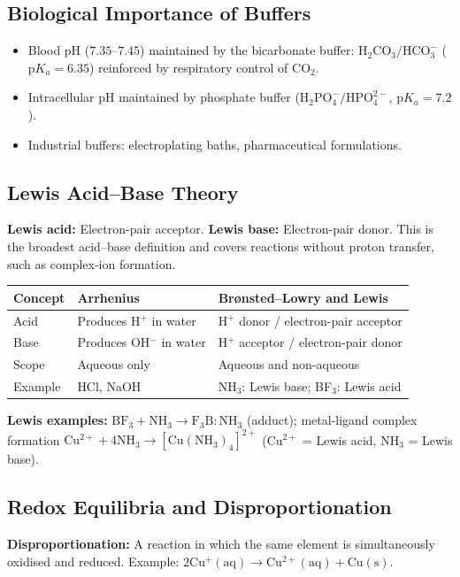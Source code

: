 \documentclass[12pt,a4paper]{article}
\begin{document}
\subsection{Biological Importance of Buffers}
\begin{itemize}[leftmargin=*, itemsep=2pt, topsep=2pt]
  \item Blood pH ($7.35$--$7.45$) maintained by the bicarbonate buffer: $\mathrm{H_2CO_3}/\mathrm{HCO_3^-}$ ($\mathrm{p}K_a = 6.35$) reinforced by respiratory control of $\mathrm{CO_2}$.
  \item Intracellular pH maintained by phosphate buffer ($\mathrm{H_2PO_4^-}/\mathrm{HPO_4^{2-}}$, $\mathrm{p}K_a = 7.2$).
  \item Industrial buffers: electroplating baths, pharmaceutical formulations.
\end{itemize}

\subsection{Lewis Acid--Base Theory}
\begin{tcolorbox}[defbox]
\textbf{Lewis acid:} Electron-pair acceptor. \textbf{Lewis base:} Electron-pair donor. This is the broadest acid--base definition and covers reactions without proton transfer, such as complex-ion formation.
\end{tcolorbox}

\begin{tabularx}{\linewidth}{|B{2.4cm}|Y|Y|}
\hline
\textbf{Concept} & \textbf{Arrhenius} & \textbf{Brønsted--Lowry} and \textbf{Lewis} \\
\hline
Acid & Produces H$^+$ in water & H$^+$ donor / electron-pair acceptor \\
\hline
Base & Produces OH$^-$ in water & H$^+$ acceptor / electron-pair donor \\
\hline
Scope & Aqueous only & Aqueous and non-aqueous \\
\hline
Example & HCl, NaOH & NH$_3$: Lewis base; BF$_3$: Lewis acid \\
\hline
\end{tabularx}

\textbf{Lewis examples:} $\mathrm{BF_3 + NH_3 \to F_3B{:}NH_3}$ (adduct); metal-ligand complex formation $\mathrm{Cu^{2+} + 4NH_3 \to [Cu(NH_3)_4]^{2+}}$ (Cu$^{2+}$ = Lewis acid, NH$_3$ = Lewis base).

\subsection{Redox Equilibria and Disproportionation}
\begin{tcolorbox}[defbox]
\textbf{Disproportionation:} A reaction in which the same element is simultaneously oxidised and reduced. Example: $\mathrm{2Cu^+(aq) \to Cu^{2+}(aq) + Cu(s)}$.
\end{tcolorbox}
\end{document}
